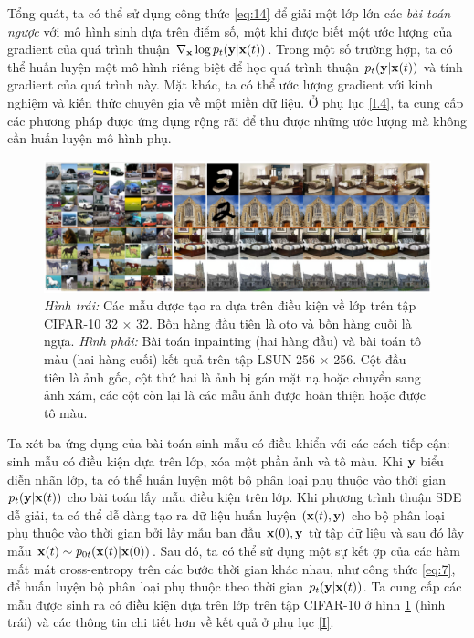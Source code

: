 \documentclass{article} %
\begin{document}
Tổng quát, ta có thể sử dụng công thức \ref{eq:14} để giải một lớp lớn các \textit{bài toán ngược} với mô hình sinh dựa trên điểm số,
một khi được biết một ước lượng của gradient của quá trình thuận $\nabla_{\bold{x}} \log p_t (\bold{y} \vert \bold{x}(t))$.
Trong một số trường hợp, ta có thể huấn luyện một mô hình riêng biệt để học quá trình thuận $p_t(\bold{y} \vert \bold{x}(t))$ và tính gradient của quá trình này.
Mặt khác, ta có thể ước lượng gradient với kinh nghiệm và kiến thức chuyên gia về một miền dữ liệu.
Ở phụ lục \ref{I.4}, ta cung cấp các phương pháp được ứng dụng rộng rãi để thu được những ước lượng mà không cần huấn luyện mô hình phụ.

\begin{figure}[h!]
    \centering
    \includegraphics[width=0.9\linewidth]{figures/4.png}
    \caption{\textit{Hình trái:} Các mẫu được tạo ra dựa trên điều kiện về lớp trên tập CIFAR-10 32 $\times$ 32.
    Bốn hàng đầu tiên là oto và bốn hàng cuối là ngựa.
    \textit{Hình phải:} Bài toán inpainting (hai hàng đầu) và bài toán tô màu (hai hàng cuối) kết quả trên tập LSUN 256 $\times$ 256.
    Cột đầu tiên là ảnh gốc, cột thứ hai là ảnh bị gán mặt nạ hoặc chuyển sang ảnh xám, các cột còn lại là các mẫu ảnh được hoàn thiện hoặc được tô màu.}
    \label{fig:4}
\end{figure}

Ta xét ba ứng dụng của bài toán sinh mẫu có điều khiển với các cách tiếp cận:
sinh mẫu có điều kiện dựa trên lớp, xóa một phần ảnh và tô màu.
Khi $\bold{y}$ biểu diễn nhãn lớp, ta có thể huấn luyện một bộ phân loại phụ thuộc vào thời gian $p_t(\bold{y} \vert \bold{x}(t))$ cho bài toán lấy mẫu điều kiện trên lớp.
Khi phương trình thuận SDE dễ giải, ta có thể dễ dàng tạo ra dữ liệu huấn luyện $(\bold{x}(t), \bold{y})$ cho bộ phân loại phụ thuộc vào thời gian bởi lấy mẫu ban đầu $\bold{x}(0), \bold{y}$ từ tập dữ liệu và sau đó lấy mẫu $\bold{x}(t) \sim p_{0t} (\bold{x}(t) \vert \bold{x}(0))$.
Sau đó, ta có thể sử dụng một sự kết ợp của các hàm mất mát cross-entropy trên các bước thời gian khác nhau, như công thức \ref{eq:7}, để huấn luyện bộ phân loại phụ thuộc theo thời gian $p_t(\bold{y} \vert \bold{x}(t))$.
Ta cung cấp các mẫu được sinh ra có điều kiện dựa trên lớp trên tập CIFAR-10 ở hình \ref{fig:4} (hình trái) và các thông tin chi tiết hơn về kết quả ở phụ lục \ref{I}.
\end{document}

